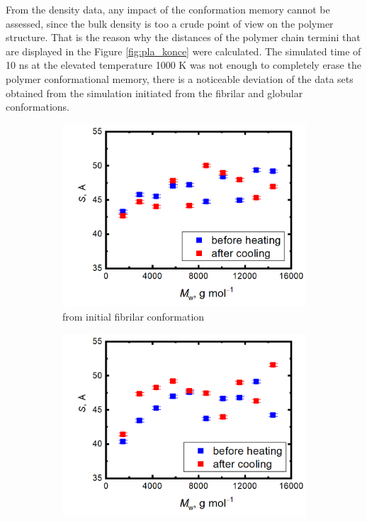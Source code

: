 From the density data, any impact of the conformation memory cannot be assessed, since the bulk density is too a crude point of view on the polymer structure. That is the reason why the distances of the polymer chain termini that are displayed in the Figure \ref{fig:pla_konce} were calculated. The simulated time of 10 ns at the elevated temperature 1000 K was not enough to completely erase the polymer conformational memory, there is a noticeable deviation of the data sets obtained from the simulation initiated from the fibrilar and globular conformations.

\begin{figure}[htb!]
	\begin{subfigure}{0.5\textwidth}
		\includegraphics[width=1.0\linewidth]{img/konce_linearni.png} 
		\caption{from initial fibrilar conformation}
		\vspace{-0.2cm}
		\label{fig:subim1}
	\end{subfigure}
	\begin{subfigure}{0.5\textwidth}
		\includegraphics[width=1.0\linewidth]{img/konce_glob.png}

\end{subfigure}
\end{figure}
